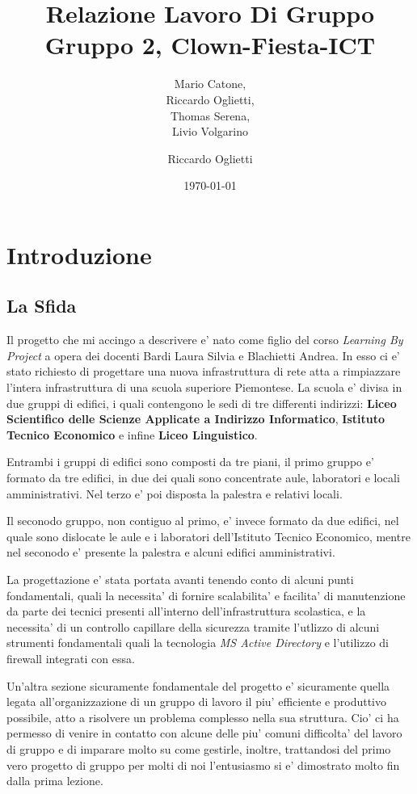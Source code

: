 \documentclass{report}
\author{Mario Catone,\\
	Riccardo Oglietti,\\
	Thomas Serena,\\
Livio Volgarino}
\title{Relazione Lavoro Di Gruppo\\
\large Gruppo 2, Clown-Fiesta-ICT}
\date{\today}
\begin{document}
	\maketitle
	\tableofcontents
	\chapter{Introduzione}
	\author{Riccardo Oglietti}
		\section{La Sfida}
			Il progetto che mi accingo a descrivere e' nato come figlio del corso \emph{Learning By Project} a opera dei docenti 
			Bardi Laura Silvia e Blachietti Andrea. In esso ci e' stato richiesto di progettare una nuova infrastruttura di 
			rete atta a rimpiazzare l'intera infrastruttura di una scuola superiore Piemontese. La scuola e' divisa in due 
			gruppi di edifici, i quali contengono le sedi di tre differenti indirizzi: \textbf{Liceo Scientifico delle Scienze 
			Applicate a Indirizzo Informatico}, \textbf{Istituto Tecnico Economico} e infine \textbf{Liceo Linguistico}.

			Entrambi i gruppi di edifici sono composti da tre piani, il primo gruppo e' formato da tre edifici, in due 
			dei quali sono concentrate aule, laboratori e locali amministrativi. Nel terzo e' poi disposta la palestra
			e relativi locali.

			Il seconodo gruppo, non contiguo al primo, e' invece formato da due edifici, nel quale sono dislocate le aule e 
			i laboratori dell'Istituto Tecnico Economico, mentre nel seconodo e' presente la palestra e alcuni edifici
			amministrativi.

			La progettazione e' stata portata avanti tenendo conto di alcuni punti fondamentali, quali la necessita' di 
			fornire scalabilita' e facilita' di manutenzione da parte dei tecnici presenti all'interno dell'infrastruttura 
			scolastica, e la necessita' di un controllo capillare della sicurezza tramite l'utlizzo di alcuni strumenti 
			fondamentali quali la tecnologia \emph{MS Active Directory} e l'utilizzo di firewall integrati con essa. 

			Un'altra sezione sicuramente fondamentale del progetto e' sicuramente quella legata all'organizzazione di un 
			gruppo di lavoro il piu' efficiente e produttivo possibile, atto a risolvere un problema complesso nella sua 
			struttura. Cio' ci ha permesso di venire in contatto con alcune delle piu' comuni difficolta' del lavoro di
			gruppo e di imparare molto su come gestirle, inoltre, trattandosi del primo vero progetto di gruppo per molti
			di noi l'entusiasmo si e' dimostrato molto fin dalla prima lezione.
\end{document}
